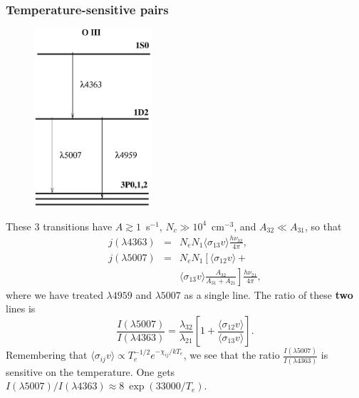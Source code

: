 \begin{frame}\frametitle{Temperature-sensitive pairs}



\begin{figure}
    \vspace{-0.5cm}
\includegraphics[width=0.39\textwidth,height=!]{./C/oiii.pdf}
\end{figure} These 3 transitions have $A \gtrsim 1$~s$^{-1}$,  $N_c \gg
10^{4}$~cm$^{-3}$, and $A_{32} \ll A_{31}$, so that 
\begin{eqnarray}
j(\lambda4363) & = &  N_e N_1 \langle \sigma_{13} v \rangle \frac{h \nu_{32}}{4\pi}, \nonumber \\
j(\lambda5007) & = &  N_e N_1 \left[ \langle \sigma_{12} v \rangle  + \right. \nonumber   \\
 &&   \left. \langle \sigma_{13} v \rangle  \frac{A_{32}}{A_{31}+A_{21}} \right] \frac{h \nu_{21}}{4\pi},  \nonumber 
\end{eqnarray}
where we have treated  $\lambda4959$ and $\lambda5007$ as a single
line. The ratio of these  {\bf two} lines is 
\[
\frac{I(\lambda 5007)}{I(\lambda4363)} = \frac{\lambda_{32}}{\lambda_{21}}
\left[1+\frac{\langle \sigma_{12} v \rangle}{\langle \sigma_{13} v
\rangle } \right].
\]
Remembering that  $\langle \sigma_{ij} v \rangle \propto T_e^{-1/2}
e^{-\chi_{ij}/kT_e}$, we see that the ratio $\frac{I(\lambda
5007)}{I(\lambda4363)} $ is sensitive on the temperature. One gets 
$I(\lambda 5007)/I(\lambda4363) \approx 8~\exp(33000/T_e)$.



\end{frame}
